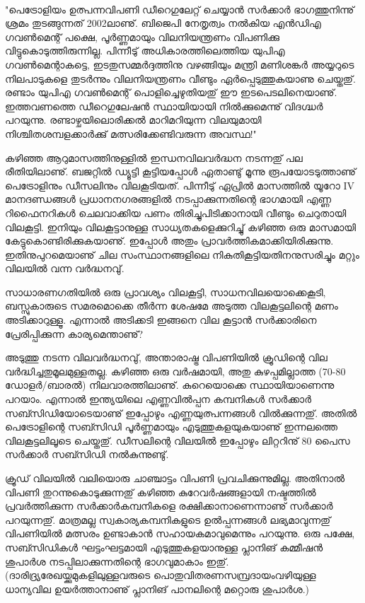 ﻿
\vskip 2pt

‌\begin{framed}
"പെട്രോളിയം ഉത്പന്നവിപണി ഡീറെഗുലേറ്റ് ചെയ്യാന്‍ സര്‍ക്കാര്‍ ഭാഗത്തുനിന്നു് ശ്രമം തുടങ്ങുന്നത് 2002ലാണു്. 
ബിജെപി നേതൃത്വം നല്‍കിയ എന്‍ഡിഎ ഗവണ്‍മെന്റ് പക്ഷെ, പൂര്‍ണ്ണമായും വിലനിയന്ത്രണം വിപണിക്കു 
വിട്ടുകൊടുത്തിരുന്നില്ല. പിന്നീടു് അധികാരത്തിലെത്തിയ യുപിഎ ഗവണ്‍മെന്റാകട്ടെ, ഇടതുസമ്മര്‍ദ്ദത്തിനു വഴങ്ങിയും 
മന്ത്രി മണിശങ്കര്‍ അയ്യറുടെ നിലപാടുകളെ തുടര്‍ന്നും വിലനിയന്ത്രണം വീണ്ടും ഏര്‍പ്പെടുത്തുകയാണു ചെയ്തതു്. രണ്ടാം 
യുപിഎ ഗവണ്‍മെന്റ് പൊളിച്ചെഴുതിയതു് ഈ ഇടപെടലിനെയാണു്. ഇത്തവണത്തെ ഡീറെഗുലേഷന്‍ സ്ഥായിയായി
നില്‍ക്കുമെന്നു് വിദഗ്ദ്ധര്‍ പറയുന്നു. രണ്ടാഴ്ചയിലൊരിക്കല്‍ മാറിമറിയുന്ന വിലയുമായി നിശ്ചിതശമ്പളക്കാര്‍ക്കു് 
മത്സരിക്കേണ്ടിവരുന്ന അവസ്ഥ!"
\end{framed}

{\vskip 12pt}


കഴിഞ്ഞ ആറുമാസത്തിനുള്ളില്‍ ഇന്ധനവിലവര്‍ദ്ധന നടന്നതു് പല രീതിയിലാണു്. ബജറ്റില്‍ ഡ്യൂട്ടി കൂട്ടിയപ്പോള്‍ 
ഏതാണ്ടു് മൂന്നു രൂപയോടടുത്താണു് പെട്രോളിനും ഡീസലിനും വിലകൂടിയത്. പിന്നീടു് ഏപ്രില്‍ മാസത്തില്‍ യൂറോ IV 
മാനദണ്ഡങ്ങള്‍ പ്രധാനനഗരങ്ങളില്‍ നടപ്പാക്കുന്നതിന്റെ ഭാഗമായി എണ്ണ റിഫൈനറികള്‍ ചെലവാക്കിയ പണം 
തിരിച്ചുപിടിക്കാനായി വീണ്ടും ചെറുതായി വിലകൂട്ടി. ഇനിയും വിലകൂട്ടാനുള്ള സാധ്യതകളെക്കുറിച്ചു് കഴിഞ്ഞ ഒരു മാസമായി
കേട്ടുകൊണ്ടിരിക്കുകയാണു്. ഇപ്പോള്‍ അതും പ്രാവര്‍ത്തികമാക്കിയിരിക്കുന്നു. ഇതിനുപുറമെയാണു് ചില സംസ്ഥാനങ്ങളിലെ
നികുതികൂട്ടിയതിനനുസരിച്ചും മറ്റും വിലയില്‍ വന്ന വര്‍ദ്ധനവു്.

സാധാരണഗതിയില്‍ ഒരു പ്രാവശ്യം വിലകൂട്ടി, സാധനവിലയൊക്കെകൂടി, ബസ്സുകാരുടെ സമരമൊക്കെ തീര്‍ന്ന 
ശേഷമേ അടുത്ത വിലകൂട്ടലിന്റെ മണം അടിക്കാറുള്ളൂ. എന്നാല്‍ അടിക്കടി ഇങ്ങനെ വില കൂട്ടാന്‍ സര്‍ക്കാരിനെ 
പ്രേരിപ്പിക്കുന്ന കാര്യമെന്താണു്?

അടുത്തു നടന്ന വിലവര്‍ദ്ധനവു്, അന്താരാഷ്ട്ര വിപണിയില്‍ ക്രൂഡിന്റെ വില വര്‍ദ്ധിച്ചതുമൂലമുള്ളതല്ല. കഴിഞ്ഞ ഒരു 
വര്‍ഷമായി, അതു കുഴപ്പമില്ലാത്ത (70-80 ഡോളര്‍/ബാരല്‍) നിലവാരത്തിലാണു്. കുറെയൊക്കെ സ്ഥായിയാണെന്നു
പറയാം. എന്നാല്‍ ഇന്ത്യയിലെ എണ്ണവില്‍പ്പന കമ്പനികള്‍ സര്‍ക്കാര്‍ സബ്സിഡിയോടെയാണു് ഇപ്പോഴും 
എണ്ണയുത്പന്നങ്ങള്‍ വില്‍ക്കുന്നതു്. അതില്‍ പെട്രോളിന്റെ സബ്സിഡി പൂര്‍ണ്ണമായും എടുത്തുകളയുകയാണു് 
ഇന്നലത്തെ വിലകൂട്ടലിലൂടെ ചെയ്തതു്. ഡീസലിന്റെ വിലയില്‍ ഇപ്പോഴും ലിറ്ററിനു് 80 പൈസ സര്‍ക്കാര്‍ 
സബ്സിഡി നല്‍കുന്നുണ്ടു്.

ക്രൂഡ് വിലയില്‍ വലിയൊരു ചാഞ്ചാട്ടം വിപണി പ്രവചിക്കുന്നുമില്ല. അതിനാല്‍ വിപണി തുറന്നുകൊടുക്കുന്നതു് 
കഴിഞ്ഞ കുറേവര്‍ഷങ്ങളായി നഷ്ടത്തില്‍ പ്രവര്‍ത്തിക്കുന്ന സര്‍ക്കാര്‍കമ്പനികളെ രക്ഷിക്കാനാണെന്നാണു് സര്‍ക്കാര്‍ 
പറയുന്നതു്. മാത്രമല്ല സ്വകാര്യകമ്പനികളുടെ ഉല്‍പ്പന്നങ്ങള്‍ ലഭ്യമാവുന്നതു് വിപണിയില്‍ മത്സരം ഉണ്ടാകാന്‍ 
സഹായകമാവുമെന്നും പറയുന്നു. ഒരു പക്ഷേ, സബ്സിഡികള്‍ ഘട്ടംഘട്ടമായി എടുത്തുകളയാനുള്ള പ്ലാനിങ് 
കമ്മീഷന്‍ ശുപാര്‍ശ നടപ്പിലാക്കുന്നതിന്റെ ഭാഗവുമാകാം ഇതു്. (ദാരിദ്ര്യരേഖയ്ക്കുമുകളിലുള്ളവരുടെ പൊതുവിതരണസമ്പ്രദായംവഴിയുള്ള ധാന്യവില ഉയര്‍ത്താനാണു് പ്ലാനിങ് പാനലിന്റെ മറ്റൊരു ശുപാര്‍ശ.)


